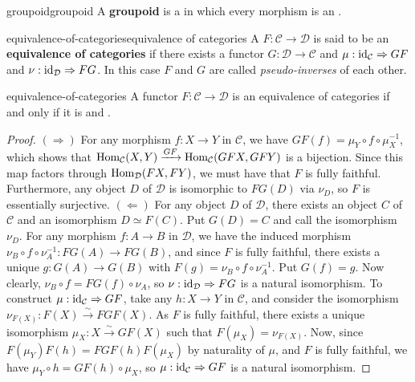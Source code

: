 \begin{topic}{groupoid}{groupoid}
    A \textbf{groupoid} is a  in which every morphism is an .
\end{topic}

\begin{topic}{equivalence-of-categories}{equivalence of categories}
    A  $F : \mathcal{C} \to \mathcal{D}$ is said to be an \textbf{equivalence of categories} if there exists a functor $G : \mathcal{D} \to \mathcal{C}$ and  $\mu : \text{id}_\mathcal{C} \Rightarrow GF$ and $\nu : \text{id}_\mathcal{D} \Rightarrow FG$. In this case $F$ and $G$ are called \textit{pseudo-inverses} of each other.
\end{topic}

\begin{example}{equivalence-of-categories}
    A functor $F : \mathcal{C} \to \mathcal{D}$ is an equivalence of categories if and only if it is   and .
    \begin{proof}
        $(\Rightarrow)$ For any morphism $f : X \to Y$ in $\mathcal{C}$, we have $GF(f) = \mu_Y \circ f \circ \mu_X^{-1}$, which shows that $\text{Hom}_\mathcal{C}(X, Y) \xrightarrow{GF} \text{Hom}_\mathcal{C}(GFX, GFY)$ is a bijection. Since this map factors through $\text{Hom}_\mathcal{D}(FX, FY)$, we must have that $F$ is fully faithful. Furthermore, any object $D$ of $\mathcal{D}$ is isomorphic to $FG(D)$ via $\nu_D$, so $F$ is essentially surjective.
        $(\Leftarrow)$ For any object $D$ of $\mathcal{D}$, there exists an object $C$ of $\mathcal{C}$ and an isomorphism $D \simeq F(C)$. Put $G(D) = C$ and call the isomorphism $\nu_D$. For any morphism $f : A \to B$ in $\mathcal{D}$, we have the induced morphism $\nu_B \circ f \circ \nu_A^{-1} : FG(A) \to FG(B)$, and since $F$ is fully faithful, there exists a unique $g : G(A) \to G(B)$ with $F(g) = \nu_B \circ f \circ \nu_A^{-1}$. Put $G(f) = g$. Now clearly, $\nu_B \circ f = FG(f) \circ \nu_A$, so $\nu : \text{id}_\mathcal{D} \Rightarrow FG$ is a natural isomorphism. To construct $\mu : \text{id}_\mathcal{C} \Rightarrow GF$, take any $h : X \to Y$ in $\mathcal{C}$, and consider the isomorphism $\nu_{F(X)} : F(X) \xrightarrow{\sim} FGF(X)$. As $F$ is fully faithful, there exists a unique isomorphism $\mu_X : X \xrightarrow{\sim} GF(X)$ such that $F(\mu_X) = \nu_{F(X)}$. Now, since $F(\mu_Y) F(h) = FGF(h) F(\mu_X)$ by naturality of $\mu$, and $F$ is fully faithful, we have $\mu_Y \circ h = GF(h) \circ \mu_X$, so $\mu : \text{id}_\mathcal{C} \Rightarrow GF$ is a natural isomorphism.
    \end{proof}
\end{example}

